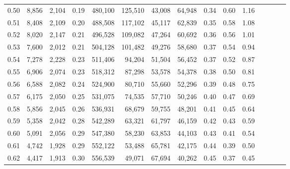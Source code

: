 \begin{tabular}{rrrcrrrrrrrrrrr}
0.50 &   8,856 &  2,104 &                                       0.19 &  480,100 &  125,510 &   43,008 &   64,948 &  0.34 &  0.60 &                         1.16 \\
0.51 &   8,408 &  2,109 &                                       0.20 &  488,508 &  117,102 &   45,117 &   62,839 &  0.35 &  0.58 &                         1.08 \\
0.52 &   8,020 &  2,147 &                                       0.21 &  496,528 &  109,082 &   47,264 &   60,692 &  0.36 &  0.56 &                         1.01 \\
0.53 &   7,600 &  2,012 &                                       0.21 &  504,128 &  101,482 &   49,276 &   58,680 &  0.37 &  0.54 &                         0.94 \\
0.54 &   7,278 &  2,228 &                                       0.23 &  511,406 &   94,204 &   51,504 &   56,452 &  0.37 &  0.52 &                         0.87 \\
0.55 &   6,906 &  2,074 &                                       0.23 &  518,312 &   87,298 &   53,578 &   54,378 &  0.38 &  0.50 &                         0.81 \\
0.56 &   6,588 &  2,082 &                                       0.24 &  524,900 &   80,710 &   55,660 &   52,296 &  0.39 &  0.48 &                         0.75 \\
0.57 &   6,175 &  2,050 &                                       0.25 &  531,075 &   74,535 &   57,710 &   50,246 &  0.40 &  0.47 &                         0.69 \\
0.58 &   5,856 &  2,045 &                                       0.26 &  536,931 &   68,679 &   59,755 &   48,201 &  0.41 &  0.45 &                         0.64 \\
0.59 &   5,358 &  2,042 &                                       0.28 &  542,289 &   63,321 &   61,797 &   46,159 &  0.42 &  0.43 &                         0.59 \\
0.60 &   5,091 &  2,056 &                                       0.29 &  547,380 &   58,230 &   63,853 &   44,103 &  0.43 &  0.41 &                         0.54 \\
0.61 &   4,742 &  1,928 &                                       0.29 &  552,122 &   53,488 &   65,781 &   42,175 &  0.44 &  0.39 &                         0.50 \\
0.62 &   4,417 &  1,913 &                                       0.30 &  556,539 &   49,071 &   67,694 &   40,262 &  0.45 &  0.37 &                         0.45 \\

\end{tabular}

